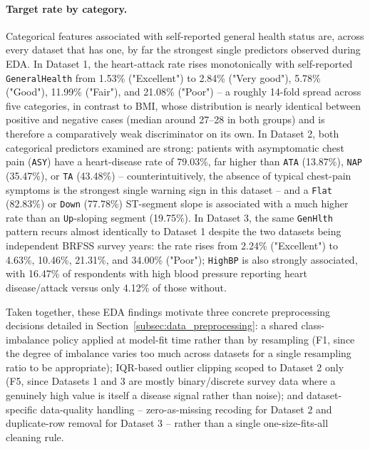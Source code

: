 \begin{sloppypar}
\paragraph{Target rate by category.} Categorical features associated with
self-reported general health status are, across every dataset that has one,
by far the strongest single predictors observed during EDA. In Dataset 1, the
heart-attack rate rises monotonically with self-reported \texttt{GeneralHealth}
from 1.53\% ("Excellent") to 2.84\% ("Very good"), 5.78\% ("Good"), 11.99\%
("Fair"), and 21.08\% ("Poor") -- a roughly 14-fold spread across five
categories, in contrast to BMI, whose distribution is nearly identical between
positive and negative cases (median around 27--28 in both groups) and is
therefore a comparatively weak discriminator on its own. In Dataset 2, both
categorical predictors examined are strong: patients with asymptomatic chest
pain (\texttt{ASY}) have a heart-disease rate of 79.03\%, far higher than
\texttt{ATA} (13.87\%), \texttt{NAP} (35.47\%), or \texttt{TA} (43.48\%) --
counterintuitively, the absence of typical chest-pain symptoms is the
strongest single warning sign in this dataset -- and a \texttt{Flat} (82.83\%)
or \texttt{Down} (77.78\%) ST-segment slope is associated with a much higher
rate than an \texttt{Up}-sloping segment (19.75\%). In Dataset 3, the same
\texttt{GenHlth} pattern recurs almost identically to Dataset 1 despite the two
datasets being independent BRFSS survey years: the rate rises from 2.24\%
("Excellent") to 4.63\%, 10.46\%, 21.31\%, and 34.00\% ("Poor"); \texttt{HighBP}
is also strongly associated, with 16.47\% of respondents with high blood
pressure reporting heart disease/attack versus only 4.12\% of those without.

Taken together, these EDA findings motivate three concrete preprocessing
decisions detailed in Section~\ref{subsec:data_preprocessing}: a shared
class-imbalance policy applied at model-fit time rather than by resampling
(F1, since the degree of imbalance varies too much across datasets for a
single resampling ratio to be appropriate); IQR-based outlier clipping scoped
to Dataset 2 only (F5, since Datasets 1 and 3 are mostly binary/discrete
survey data where a genuinely high value is itself a disease signal rather
than noise); and dataset-specific data-quality handling -- zero-as-missing
recoding for Dataset 2 and duplicate-row removal for Dataset 3 -- rather than
a single one-size-fits-all cleaning rule.
\end{sloppypar}

